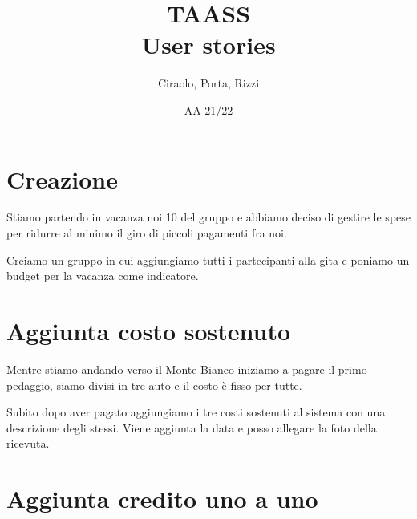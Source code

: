 \documentclass[10pt,a4paper]{article}
\author{Ciraolo, Porta, Rizzi}
\title{TAASS\\User stories}
\date{AA 21/22}
\begin{document}
	\maketitle
	
%	
	
	
	\section{Creazione}
	
	Stiamo partendo in vacanza noi 10 del gruppo e abbiamo deciso di gestire le spese per ridurre al minimo il giro di piccoli pagamenti fra noi.
	
	Creiamo un gruppo in cui aggiungiamo tutti i partecipanti alla gita e poniamo un budget per la vacanza come indicatore.
	
	\section{Aggiunta costo sostenuto}
	
	Mentre stiamo andando verso il Monte Bianco iniziamo a pagare il primo pedaggio, siamo divisi in tre auto e il costo è fisso per tutte.
	
	Subito dopo aver pagato aggiungiamo i tre costi sostenuti al sistema con una descrizione degli stessi. Viene aggiunta la data e posso allegare la foto della ricevuta.
	
	\section{Aggiunta credito uno a uno}
	
\end{document}
